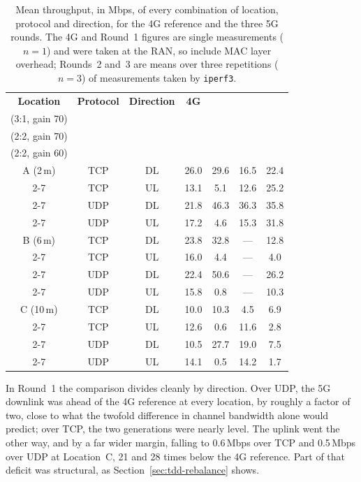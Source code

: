 \begin{table}[htbp]
    \centering
    \begin{tabular}{|c|c|c|c|c|c|c|}
        \hline
        \textbf{Location} & \textbf{Protocol} & \textbf{Direction} & \textbf{4G} & \makecell{\textbf{Round 1}\\(3:1, gain 70)} & \makecell{\textbf{Round 2}\\(2:2, gain 70)} & \makecell{\textbf{Round 3}\\(2:2, gain 60)} \\
        \hline
        A (2\,m) & TCP & DL & 26.0 & 29.6 & 16.5 & 22.4 \\
        \cline{2-7}
         & TCP & UL & 13.1 & 5.1 & 12.6 & 25.2 \\
        \cline{2-7}
         & UDP & DL & 21.8 & 46.3 & 36.3 & 35.8 \\
        \cline{2-7}
         & UDP & UL & 17.2 & 4.6 & 15.3 & 31.8 \\
        \hline
        B (6\,m) & TCP & DL & 23.8 & 32.8 & --- & 12.8 \\
        \cline{2-7}
         & TCP & UL & 16.0 & 4.4 & --- & 4.0 \\
        \cline{2-7}
         & UDP & DL & 22.4 & 50.6 & --- & 26.2 \\
        \cline{2-7}
         & UDP & UL & 15.8 & 0.8 & --- & 10.3 \\
        \hline
        C (10\,m) & TCP & DL & 10.0 & 10.3 & 4.5 & 6.9 \\
        \cline{2-7}
         & TCP & UL & 12.6 & 0.6 & 11.6 & 2.8 \\
        \cline{2-7}
         & UDP & DL & 10.5 & 27.7 & 19.0 & 7.5 \\
        \cline{2-7}
         & UDP & UL & 14.1 & 0.5 & 14.2 & 1.7 \\
        \hline
    \end{tabular}
    \caption[Mean throughput by location, protocol and direction.]{Mean throughput, in Mbps, of every combination of location, protocol and direction, for the 4G reference and the three 5G rounds. The 4G and Round~1 figures are single measurements ($n=1$) and were taken at the \gls{RAN}, so include MAC layer overhead; Rounds~2 and~3 are means over three repetitions ($n=3$) of measurements taken by \texttt{iperf3}.}
    \label{tab:throughput-summary}
\end{table}

In Round~1 the comparison divides cleanly by direction. Over UDP, the 5G downlink was ahead of the 4G reference at every location, by roughly a factor of two, close to what the twofold difference in channel bandwidth alone would predict; over TCP, the two generations were nearly level. The uplink went the other way, and by a far wider margin, falling to 0.6\,Mbps over TCP and 0.5\,Mbps over UDP at Location~C, 21 and 28 times below the 4G reference. Part of that deficit was structural, as Section~\ref{sec:tdd-rebalance} shows.

